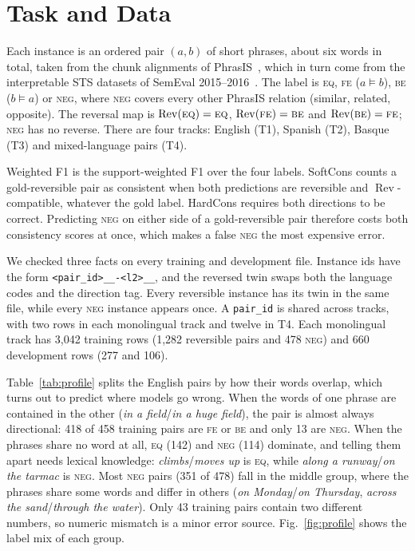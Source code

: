 \documentclass[conference]{IEEEtran}
\newcommand{\rev}{\operatorname{Rev}}
\newcommand{\EQ}{\textsc{eq}}
\newcommand{\FE}{\textsc{fe}}
\newcommand{\BE}{\textsc{be}}
\newcommand{\NEG}{\textsc{neg}}
\begin{document}
\section{Task and Data}

Each instance is an ordered pair $(a,b)$ of short phrases, about six words in
total, taken from the chunk alignments of PhrasIS~\cite{phrasis2024}, which in
turn come from the interpretable STS datasets of SemEval
2015--2016~\cite{semeval2015sts,semeval2016ists,lopezgazpio2017ists}. The label
is \EQ, \FE{} ($a \models b$), \BE{} ($b \models a$) or \NEG, where \NEG{}
covers every other PhrasIS relation (similar, related, opposite). The reversal
map is $\rev(\EQ)=\EQ$, $\rev(\FE)=\BE$ and $\rev(\BE)=\FE$; \NEG{} has no
reverse. There are four tracks: English (T1), Spanish (T2), Basque (T3) and
mixed-language pairs (T4).

Weighted F1 is the support-weighted F1 over the four labels. SoftCons counts
a gold-reversible pair as consistent when both predictions are reversible and
$\rev$-compatible, whatever the gold label. HardCons requires both directions
to be correct. Predicting \NEG{} on either side of a gold-reversible pair
therefore costs both consistency scores at once, which makes a false \NEG{}
the most expensive error.

We checked three facts on every training and development file. Instance ids
have the form \texttt{<pair\_id>\_\_<l1>-<l2>\_\_<original|flipped>}, and the
reversed twin swaps both the language codes and the direction tag. Every
reversible instance has its twin in the same file, while every \NEG{} instance
appears once. A \texttt{pair\_id} is shared across tracks, with two rows in
each monolingual track and twelve in T4. Each monolingual track has 3{,}042
training rows (1{,}282 reversible pairs and 478 \NEG) and 660 development rows
(277 and 106).

Table~\ref{tab:profile} splits the English pairs by how their words overlap,
which turns out to predict where models go wrong. When the words of one phrase
are contained in the other (\emph{in a field}/\emph{in a huge field}), the pair
is almost always directional: 418 of 458
training pairs are \FE{} or \BE{} and only 13 are \NEG. When the phrases share
no word at all, \EQ{} (142) and \NEG{} (114) dominate, and telling them apart
needs lexical knowledge: \emph{climbs}/\emph{moves up} is \EQ{}, while
\emph{along a runway}/\emph{on the tarmac} is \NEG. Most \NEG{} pairs (351 of
478) fall in the middle group, where the phrases share some words and differ in
others (\emph{on Monday}/\emph{on Thursday}, \emph{across the sand}/\emph{through
the water}). Only 43 training pairs contain two different numbers, so numeric
mismatch is a minor error source. Fig.~\ref{fig:profile} shows the label mix of
each group.
\end{document}

